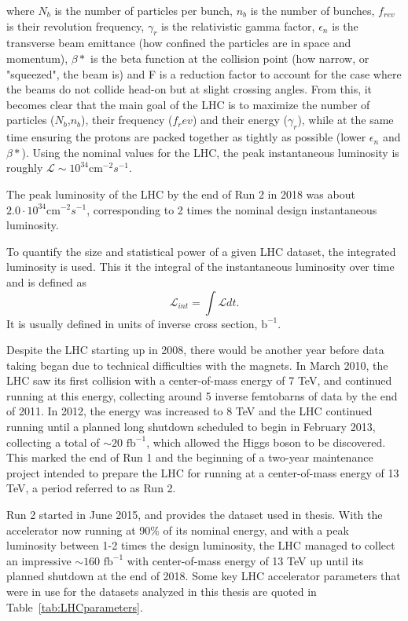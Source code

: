 where $N_b$ is the number of particles per bunch, $n_b$ is the number of bunches, $f_{rev}$ is their revolution frequency, $\gamma_r$ is the relativistic gamma factor, $\epsilon_n$ is the transverse beam emittance (how confined the particles are in space and momentum), $\beta *$ is the beta function at the collision point (how narrow, or "squeezed", the beam is) and F is a reduction factor to account for the case where the beams do not collide head-on but at slight crossing angles.
From this, it becomes clear that the main goal of the LHC is to maximize the number of particles ($N_b$,$n_b$), their frequency ($f_rev$) and their energy ($\gamma_r$), while at the same time ensuring the protons are packed together as tightly as possible (lower $\epsilon_n$ and $\beta *$).
Using the nominal values for the LHC, the peak instantaneous luminosity is roughly $\mathcal L \sim 10^{34} \textrm{cm}^{-2} s^{-1}$. 


The peak luminosity of the LHC by the end of Run 2 in 2018 was about $2.0 \cdot 10^{34} \textrm{cm}^{-2} s^{-1}$, corresponding to 2 times the nominal design instantaneous luminosity.

To quantify the size and statistical power of a given LHC dataset, the integrated luminosity is used. This it the integral of the instantaneous luminosity over time and is defined as
\begin{equation}
  \mathcal L_{int} = \int \mathcal L dt.
\end{equation}
It is usually defined in units of inverse cross section, $\textrm{b}^{-1}$.


Despite the LHC starting up in 2008, there would be another year before data taking began due to technical difficulties with the magnets. In March 2010, the LHC saw its first collision with a center-of-mass energy of 7 TeV, and continued running at this energy, collecting around 5 inverse femtobarns of data by the end of 2011. In 2012, the energy was increased to 8 TeV and the LHC continued running until a planned long shutdown scheduled to begin in February 2013, collecting a total of $\sim 20 \textrm{ fb}^{-1}$, which allowed the Higgs boson to be discovered. This marked the end of Run 1 and the beginning of a two-year maintenance project intended to prepare the LHC for running at a center-of-mass energy of 13 TeV, a period referred to as Run 2.

Run 2 started in June 2015, and provides the dataset used in thesis. With the accelerator now running at 90\% of its nominal energy, and with a peak luminosity between 1-2 times the design luminosity, the LHC managed to collect an impressive $\sim 160 \textrm{ fb}^{-1}$ with center-of-mass energy of 13 TeV up until its planned shutdown at the end of 2018. Some key LHC accelerator parameters that were in use for the datasets analyzed in this thesis are quoted in Table~\ref{tab:LHCparameters}.

